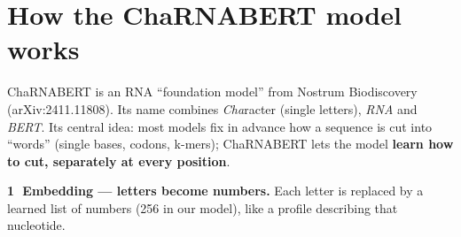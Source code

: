 \documentclass[11pt,a4paper]{article}
\begin{document}
\section{How the ChaRNABERT model works}

ChaRNABERT is an RNA ``foundation model'' from Nostrum Biodiscovery (arXiv:2411.11808). Its name
combines \emph{Cha}racter (single letters), \emph{RNA} and \emph{BERT}. Its central idea: most
models fix in advance how a sequence is cut into ``words'' (single bases, codons, k-mers);
ChaRNABERT lets the model \textbf{learn how to cut, separately at every position}.

\begin{center}
\end{center}

\textbf{\textcircled{1} Embedding --- letters become numbers.} Each letter is replaced by a learned
list of numbers (256 in our model), like a profile describing that nucleotide.
\end{document}
